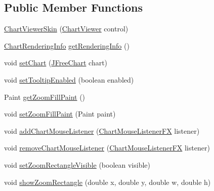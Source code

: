 \subsection*{Public Member Functions}
\begin{DoxyCompactItemize}
\item 
\mbox{\hyperlink{classorg_1_1jfree_1_1chart_1_1fx_1_1_chart_viewer_skin_a8da40c1b58a9780eceafab28f6d97751}{Chart\+Viewer\+Skin}} (\mbox{\hyperlink{classorg_1_1jfree_1_1chart_1_1fx_1_1_chart_viewer}{Chart\+Viewer}} control)
\item 
\mbox{\hyperlink{classorg_1_1jfree_1_1chart_1_1_chart_rendering_info}{Chart\+Rendering\+Info}} \mbox{\hyperlink{classorg_1_1jfree_1_1chart_1_1fx_1_1_chart_viewer_skin_a7bc3cbad36d12e3acfb9679776823215}{get\+Rendering\+Info}} ()
\item 
void \mbox{\hyperlink{classorg_1_1jfree_1_1chart_1_1fx_1_1_chart_viewer_skin_a12ed36a468c16c40d539492c12d5c21d}{set\+Chart}} (\mbox{\hyperlink{classorg_1_1jfree_1_1chart_1_1_j_free_chart}{J\+Free\+Chart}} chart)
\item 
void \mbox{\hyperlink{classorg_1_1jfree_1_1chart_1_1fx_1_1_chart_viewer_skin_a2bf0dfe48c946544b7d81141125f5c04}{set\+Tooltip\+Enabled}} (boolean enabled)
\item 
Paint \mbox{\hyperlink{classorg_1_1jfree_1_1chart_1_1fx_1_1_chart_viewer_skin_ad9ee5c9e849a9af70debddcbae0de4e4}{get\+Zoom\+Fill\+Paint}} ()
\item 
void \mbox{\hyperlink{classorg_1_1jfree_1_1chart_1_1fx_1_1_chart_viewer_skin_af39e0f8de41f3ebb32115dfdbfcf853c}{set\+Zoom\+Fill\+Paint}} (Paint paint)
\item 
void \mbox{\hyperlink{classorg_1_1jfree_1_1chart_1_1fx_1_1_chart_viewer_skin_ac377d76d4ca26d795e1f0983c473d478}{add\+Chart\+Mouse\+Listener}} (\mbox{\hyperlink{interfaceorg_1_1jfree_1_1chart_1_1fx_1_1interaction_1_1_chart_mouse_listener_f_x}{Chart\+Mouse\+Listener\+FX}} listener)
\item 
void \mbox{\hyperlink{classorg_1_1jfree_1_1chart_1_1fx_1_1_chart_viewer_skin_a44c6131f43a641a3dff487c44b014dd6}{remove\+Chart\+Mouse\+Listener}} (\mbox{\hyperlink{interfaceorg_1_1jfree_1_1chart_1_1fx_1_1interaction_1_1_chart_mouse_listener_f_x}{Chart\+Mouse\+Listener\+FX}} listener)
\item 
void \mbox{\hyperlink{classorg_1_1jfree_1_1chart_1_1fx_1_1_chart_viewer_skin_ac1a1e5e4bb95eb0c52110873e03016b4}{set\+Zoom\+Rectangle\+Visible}} (boolean visible)
\item 
void \mbox{\hyperlink{classorg_1_1jfree_1_1chart_1_1fx_1_1_chart_viewer_skin_ad5b65f1c94edcd06773a7c6ad4b17f72}{show\+Zoom\+Rectangle}} (double x, double y, double w, double h)
\end{DoxyCompactItemize}



